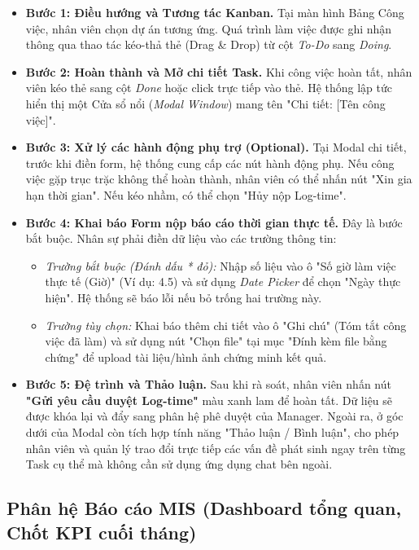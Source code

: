 \documentclass[a4paper,13.5pt]{extreport}
\begin{document}
\begin{itemize}
    \item \textbf{Bước 1: Điều hướng và Tương tác Kanban.} Tại màn hình Bảng Công việc, nhân viên chọn dự án tương ứng. Quá trình làm việc được ghi nhận thông qua thao tác kéo-thả thẻ (Drag \& Drop) từ cột \textit{To-Do} sang \textit{Doing}.
    
    \item \textbf{Bước 2: Hoàn thành và Mở chi tiết Task.} Khi công việc hoàn tất, nhân viên kéo thẻ sang cột \textit{Done} hoặc click trực tiếp vào thẻ. Hệ thống lập tức hiển thị một Cửa sổ nổi (\textit{Modal Window}) mang tên "Chi tiết: [Tên công việc]".
    
    \item \textbf{Bước 3: Xử lý các hành động phụ trợ (Optional).} Tại Modal chi tiết, trước khi điền form, hệ thống cung cấp các nút hành động phụ. Nếu công việc gặp trục trặc không thể hoàn thành, nhân viên có thể nhấn nút "Xin gia hạn thời gian". Nếu kéo nhầm, có thể chọn "Hủy nộp Log-time".
    
    \item \textbf{Bước 4: Khai báo Form nộp báo cáo thời gian thực tế.} Đây là bước bắt buộc. Nhân sự phải điền dữ liệu vào các trường thông tin:
        \begin{itemize}
            \item \textit{Trường bắt buộc (Đánh dấu * đỏ):} Nhập số liệu vào ô "Số giờ làm việc thực tế (Giờ)" (Ví dụ: 4.5) và sử dụng \textit{Date Picker} để chọn "Ngày thực hiện". Hệ thống sẽ báo lỗi nếu bỏ trống hai trường này.
            \item \textit{Trường tùy chọn:} Khai báo thêm chi tiết vào ô "Ghi chú" (Tóm tắt công việc đã làm) và sử dụng nút "Chọn file" tại mục "Đính kèm file bằng chứng" để upload tài liệu/hình ảnh chứng minh kết quả.
        \end{itemize}
    
    \item \textbf{Bước 5: Đệ trình và Thảo luận.} Sau khi rà soát, nhân viên nhấn nút \textbf{"Gửi yêu cầu duyệt Log-time"} màu xanh lam để hoàn tất. Dữ liệu sẽ được khóa lại và đẩy sang phân hệ phê duyệt của Manager. Ngoài ra, ở góc dưới của Modal còn tích hợp tính năng "Thảo luận / Bình luận", cho phép nhân viên và quản lý trao đổi trực tiếp các vấn đề phát sinh ngay trên từng Task cụ thể mà không cần sử dụng ứng dụng chat bên ngoài.
\end{itemize}
\subsection{Phân hệ Báo cáo MIS (Dashboard tổng quan, Chốt KPI cuối tháng)}
\end{document}
